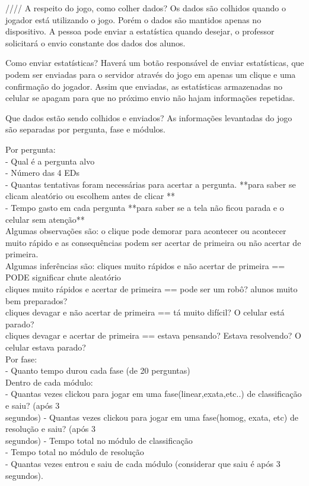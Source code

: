 ////
A respeito do jogo, como colher dados? Os dados são colhidos quando o jogador está utilizando o jogo. Porém o dados são mantidos apenas no dispositivo. A pessoa pode enviar a estatística quando desejar, o professor solicitará o envio constante dos dados dos alunos.

Como enviar estatísticas? Haverá um botão responsável de enviar estatísticas, que podem ser enviadas para o servidor através do jogo em apenas um clique e uma confirmação do jogador. Assim que enviadas, as estatísticas armazenadas no celular se apagam para que no próximo envio não hajam informações repetidas.

Que dados estão sendo colhidos e enviados? As informações levantadas do jogo são separadas por pergunta, fase e módulos.

Por pergunta:\\
	- Qual é a pergunta alvo\\
	- Número das 4 EDs\\
	- Quantas tentativas foram necessárias para acertar a pergunta. **para saber se clicam aleatório ou escolhem antes de clicar **\\
	- Tempo gasto em cada pergunta  **para saber se a tela não ficou parada e o celular sem atenção**\\

	Algumas observações são: o clique pode demorar para acontecer ou acontecer muito rápido e as consequências podem ser acertar de primeira ou não acertar de primeira.\\
	Algumas inferências são: 
	cliques muito rápidos e não acertar de primeira == PODE significar chute aleatório\\
	cliques muito rápidos e acertar de primeira == pode ser um robô? alunos muito bem preparados?\\
	cliques devagar e não acertar de primeira == tá muito difícil? O celular está parado? \\
	cliques devagar e acertar de primeira == estava pensando? Estava resolvendo? O celular estava parado?\\

Por fase:\\
	- Quanto tempo durou cada fase (de 20 perguntas)\\

Dentro de cada módulo:\\
	- Quantas vezes clickou para jogar em uma fase(linear,exata,etc..) de classificação e saiu? (após 3 \\segundos)
	- Quantas vezes clickou para jogar em uma fase(homog, exata, etc) de resolução e saiu? (após 3 \\segundos)
	- Tempo total no módulo de classificação\\
	- Tempo total no módulo de resolução\\
	- Quantas vezes entrou e saiu de cada módulo (considerar que saiu é após 3 segundos).\\


